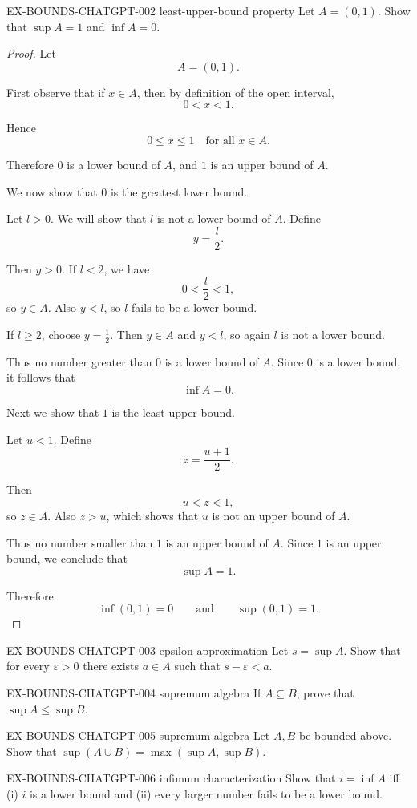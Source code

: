 \exstubgen
{EX-BOUNDS-CHATGPT-002}
{least-upper-bound property}
{Let $A=(0,1)$. Show that $\sup A=1$ and $\inf A=0$.}
\begin{proof}
Let
\[
A=(0,1).
\]

First observe that if $x\in A$, then by definition of the open interval,
\[
0<x<1.
\]

Hence
\[
0\le x \le 1
\quad\text{for all }x\in A.
\]

Therefore $0$ is a lower bound of $A$, and $1$ is an upper bound of $A$.

\medskip

We now show that $0$ is the greatest lower bound.

Let $l>0$. We will show that $l$ is not a lower bound of $A$.
Define
\[
y=\frac{l}{2}.
\]

Then $y>0$. If $l<2$, we have
\[
0<\frac{l}{2}<1,
\]
so $y\in A$. Also $y<l$, so $l$ fails to be a lower bound.

If $l\ge 2$, choose $y=\frac12$. Then $y\in A$ and $y<l$, so again $l$
is not a lower bound.

Thus no number greater than $0$ is a lower bound of $A$. Since $0$ is a
lower bound, it follows that
\[
\inf A=0.
\]

\medskip

Next we show that $1$ is the least upper bound.

Let $u<1$. Define
\[
z=\frac{u+1}{2}.
\]

Then
\[
u<z<1,
\]
so $z\in A$. Also $z>u$, which shows that $u$ is not an upper bound of $A$.

Thus no number smaller than $1$ is an upper bound of $A$. Since $1$ is an
upper bound, we conclude that
\[
\sup A=1.
\]

Therefore
\[
\inf(0,1)=0
\qquad\text{and}\qquad
\sup(0,1)=1.
\]
\end{proof}

\exstubgen
{EX-BOUNDS-CHATGPT-003}
{epsilon-approximation}
{Let $s=\sup A$. Show that for every $\varepsilon>0$ there exists $a\in A$
such that $s-\varepsilon<a$.}

\exstubgen
{EX-BOUNDS-CHATGPT-004}
{supremum algebra}
{If $A\subseteq B$, prove that $\sup A \le \sup B$.}

\exstubgen
{EX-BOUNDS-CHATGPT-005}
{supremum algebra}
{Let $A,B$ be bounded above. Show that $\sup(A\cup B)=\max(\sup A,\sup B)$.}

\exstubgen
{EX-BOUNDS-CHATGPT-006}
{infimum characterization}
{Show that $i=\inf A$ iff (i) $i$ is a lower bound and (ii) every larger number
fails to be a lower bound.}

